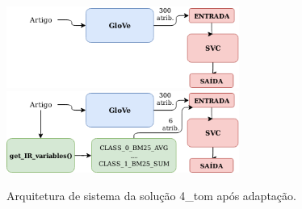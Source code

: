 \begin{figure}[h]
    \centering
    \caption{Arquitetura de sistema da solução 4\_tom após adaptação.}
    \begin{center}
        \begin{overprint}
            \centering\includegraphics[width=0.68\textwidth]{img/4-tom-arquitetura-sem-ri.png}\centering\includegraphics[width=0.68\textwidth]{img/4-tom-arquitetura-com-ri.png}
        \end{overprint}
    \end{center}
    \vspace{-0.0cm}
    \label{fig:4-tom-arquitetura-com-ri}
\end{figure}